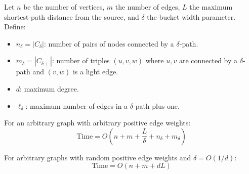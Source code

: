 \documentclass[12pt]{article}
\begin{document}
Let $n$ be the number of vertices, $m$ the number of edges, $L$ the maximum shortest-path distance from the source, and $\delta$ the bucket width parameter. Define:

\begin{itemize}
    \item $n_\delta = |C_\delta|$: number of pairs of nodes connected by a $\delta$-path.
    \item $m_\delta = |C_{\delta+}|$: number of triples $(u, v, w)$ where $u, v$ are connected by a $\delta$-path and $(v, w)$ is a light edge.
    \item $d$: maximum degree.
    \item $\ell_\delta$: maximum number of edges in a $\delta$-path plus one.
\end{itemize}

For an arbitrary graph with arbitrary positive edge weights:
\[
\text{Time} = O\left( n + m + \frac{L}{\delta} + n_\delta + m_\delta \right)
\]

For arbitrary graphs with random positive edge weights and $\delta = O(1/d)$:
\[
\text{Time} = O(n + m + d L)
\]
\end{document}
